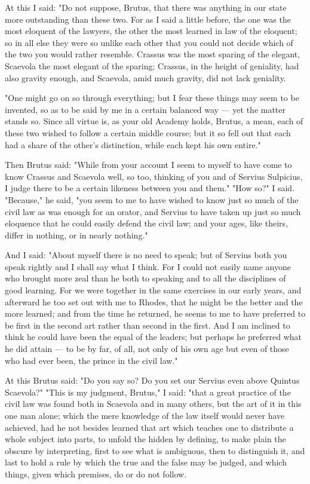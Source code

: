  At this I said: "Do not suppose, Brutus, that there was anything in our state more outstanding than these two. For as I said a little before, the one was the most eloquent of the lawyers, the other the most learned in law of the eloquent; so in all else they were so unlike each other that you could not decide which of the two you would rather resemble. Crassus was the most sparing of the elegant, Scaevola the most elegant of the sparing; Crassus, in the height of geniality, had also gravity enough, and Scaevola, amid much gravity, did not lack geniality.

 "One might go on so through everything; but I fear these things may seem to be invented, so as to be said by me in a certain balanced way — yet the matter stands so. Since all virtue is, as your old Academy holds, Brutus, a mean, each of these two wished to follow a certain middle course; but it so fell out that each had a share of the other's distinction, while each kept his own entire."

 Then Brutus said: "While from your account I seem to myself to have come to know Crassus and Scaevola well, so too, thinking of you and of Servius Sulpicius, I judge there to be a certain likeness between you and them." "How so?" I said. "Because," he said, "you seem to me to have wished to know just so much of the civil law as was enough for an orator, and Servius to have taken up just so much eloquence that he could easily defend the civil law; and your ages, like theirs, differ in nothing, or in nearly nothing."

 And I said: "About myself there is no need to speak; but of Servius both you speak rightly and I shall say what I think. For I could not easily name anyone who brought more zeal than he both to speaking and to all the disciplines of good learning. For we were together in the same exercises in our early years, and afterward he too set out with me to Rhodes, that he might be the better and the more learned; and from the time he returned, he seems to me to have preferred to be first in the second art rather than second in the first. And I am inclined to think he could have been the equal of the leaders; but perhaps he preferred what he did attain — to be by far, of all, not only of his own age but even of those who had ever been, the prince in the civil law."

 At this Brutus said: "Do you say so? Do you set our Servius even above Quintus Scaevola?" "This is my judgment, Brutus," I said: "that a great practice of the civil law was found both in Scaevola and in many others, but the art of it in this one man alone; which the mere knowledge of the law itself would never have achieved, had he not besides learned that art which teaches one to distribute a whole subject into parts, to unfold the hidden by defining, to make plain the obscure by interpreting, first to see what is ambiguous, then to distinguish it, and last to hold a rule by which the true and the false may be judged, and which things, given which premises, do or do not follow.

